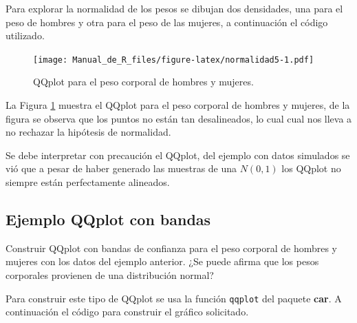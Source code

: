 \documentclass[10pt,]{krantz}
\makeatletter
\newenvironment{Shaded}{\begin{snugshade}}{\end{snugshade}}
\newcommand{\KeywordTok}[1]{\textcolor[rgb]{0.13,0.29,0.53}{\textbf{{#1}}}}
\newcommand{\DataTypeTok}[1]{\textcolor[rgb]{0.13,0.29,0.53}{{#1}}}
\newcommand{\DecValTok}[1]{\textcolor[rgb]{0.00,0.00,0.81}{{#1}}}
\newcommand{\StringTok}[1]{\textcolor[rgb]{0.31,0.60,0.02}{{#1}}}
\newcommand{\NormalTok}[1]{{#1}}
\newenvironment{kframe}{%
\medskip{}
\setlength{\fboxsep}{.8em}
 \def\at@end@of@kframe{}%
 \ifinner\ifhmode%
  \def\at@end@of@kframe{\end{minipage}}%
  \begin{minipage}{\columnwidth}%
 \fi\fi%
 \def\FrameCommand##1{\hskip\@totalleftmargin \hskip-\fboxsep
 \colorbox{shadecolor}{##1}\hskip-\fboxsep
     \hskip-\linewidth \hskip-\@totalleftmargin \hskip\columnwidth}%
 \MakeFramed {\advance\hsize-\width
   \@totalleftmargin\z@ \linewidth\hsize
   \@setminipage}}%
 {\par\unskip\endMakeFramed%
 \at@end@of@kframe}
\renewenvironment{Shaded}{\begin{kframe}}{\end{kframe}}
\let\BeginKnitrBlock\begin \let\EndKnitrBlock\end
\makeatother
\begin{document}
Para explorar la normalidad de los pesos se dibujan dos densidades, una
para el peso de hombres y otra para el peso de las mujeres, a
continuación el código utilizado.

\begin{Shaded}
\end{Shaded}

\begin{figure}[htbp]
\centering
\texttt{[image: Manual\_de\_R\_files/figure-latex/normalidad5-1.pdf]}
\caption{\label{fig:normalidad5}QQplot para el peso corporal de hombres y
mujeres.}
\end{figure}

La Figura \ref{fig:normalidad5} muestra el QQplot para el peso corporal
de hombres y mujeres, de la figura se observa que los puntos no están
tan desalineados, lo cual cual nos lleva a no rechazar la hipótesis de
normalidad.

\BeginKnitrBlock{rmdwarning}
Se debe interpretar con precaución el QQplot, del ejemplo con datos
simulados se vió que a pesar de haber generado las muestras de una
\(N(0,1)\) los QQplot no siempre están perfectamente alineados.
\EndKnitrBlock{rmdwarning}

\subsection*{Ejemplo QQplot con bandas}\label{ejemplo-qqplot-con-bandas}


Construir QQplot con bandas de confianza para el peso corporal de
hombres y mujeres con los datos del ejemplo anterior. ¿Se puede afirma
que los pesos corporales provienen de una distribución normal?

Para construir este tipo de QQplot se usa la función \texttt{qqplot} del
paquete \textbf{car}. A continuación el código para construir el gráfico
solicitado.
\end{document}
